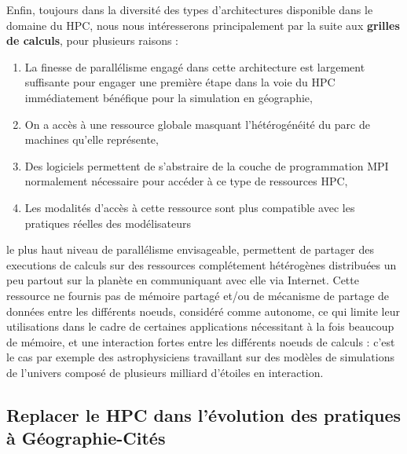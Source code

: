 Enfin, toujours dans la diversité des types d'architectures disponible dans le domaine du HPC, nous nous intéresserons principalement par la suite aux \textbf{grilles de calculs}, pour plusieurs raisons : 

\begin{enumerate}[label=(\alph*),labelindent=\parindent,leftmargin=*]
\item La finesse de parallélisme engagé dans cette architecture est largement suffisante pour engager une première étape dans la voie du HPC immédiatement bénéfique pour la simulation en géographie,
\item On a accès à une ressource globale masquant l'hétérogénéité du parc de machines qu'elle représente,
\item Des logiciels permettent de s'abstraire de la couche de programmation MPI normalement nécessaire pour accéder à ce type de ressources HPC,
\item Les modalités d'accès à cette ressource sont plus compatible avec les pratiques réelles des modélisateurs
\end{enumerate}

le plus haut niveau de parallélisme envisageable, permettent de partager des executions de calculs sur des ressources complétement hétérogènes distribuées un peu partout sur la planète en communiquant avec elle via Internet. Cette ressource ne fournis pas de mémoire partagé et/ou de mécanisme de partage de données entre les différents noeuds, considéré comme autonome, ce qui limite leur utilisations dans le cadre de certaines applications nécessitant à la fois beaucoup de mémoire, et une interaction fortes entre les différents noeuds de calculs : c'est le cas par exemple des astrophysiciens travaillant sur des modèles de simulations de l'univers composé de plusieurs milliard d'étoiles en interaction. 




\subsection{Replacer le HPC dans l'évolution des pratiques à Géographie-Cités}


